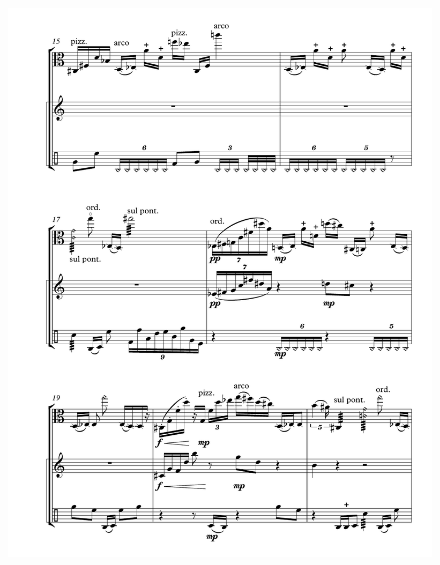 \begin{figure}[htbp]
    \centering
	\includegraphics[width=6.5in]{figures/Viola_Percussion_3.pdf}
\end{figure}

